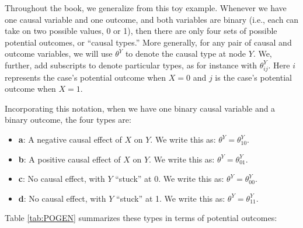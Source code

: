 \documentclass[12pt,]{book}
\providecommand{\tightlist}{%
  \setlength{\itemsep}{0pt}\setlength{\parskip}{0pt}}
\begin{document}
Throughout the book, we generalize from this toy example. Whenever we have one causal variable and one outcome, and both variables are binary (i.e., each can take on two possible values, 0 or 1), then there are only four sets of possible potential outcomes, or ``causal types.'' More generally, for any pair of causal and outcome variables, we will use \(\theta^Y\) to denote the causal type at node \(Y\). We, further, add subscripts to denote particular types, as for instance with \(\theta^Y_{ij}\). Here \(i\) represents the case's potential outcome when \(X=0\) and \(j\) is the case's potential outcome when \(X=1\).

Incorporating this notation, when we have one binary causal variable and a binary outcome, the four types are:

\begin{itemize}
\tightlist
\item
  \textbf{a}: A negative causal effect of \(X\) on \(Y\). We write this as: \(\theta^Y = \theta^Y_{10}\).
\item
  \textbf{b}: A positive causal effect of \(X\) on \(Y\). We write this as: \(\theta^Y = \theta^Y_{01}\).
\item
  \textbf{c}: No causal effect, with \(Y\) ``stuck'' at 0. We write this as: \(\theta^Y = \theta^Y_{00}\).
\item
  \textbf{d}: No causal effect, with \(Y\) ``stuck'' at 1. We write this as: \(\theta^Y = \theta^Y_{11}\).
\end{itemize}

Table \ref{tab:POGEN} summarizes these types in terms of potential outcomes:
\end{document}
